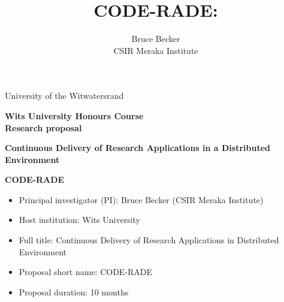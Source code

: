 \documentclass[oneside, a4paper, onecolumn, 11pt]{article}
\title{CODE-RADE:\\ }
\author{Bruce Becker\\ CSIR Meraka Institute}
\begin{document}
\noindent
University of the Witwatersrand

\vfill

\begin{center}
\large{\textbf{Wits University Honours Course\\
Research proposal }
}
\vfill

\LARGE{\textbf{Continuous Delivery of Research Applications in a Distributed Environment }}

\vfill

\LARGE{\textbf{CODE-RADE}}

\vfill

\end{center}

\vfill

\begin{itemize}
\item Principal investigator (PI): Bruce Becker (CSIR Meraka Institute)
\item Host institution: Wits University
\item Full title: Continuous Delivery of Research Applications in Distributed Environment
\item Proposal short name: CODE-RADE
\item Proposal duration: 10 months
\end{itemize}


\vfill
\end{document}
